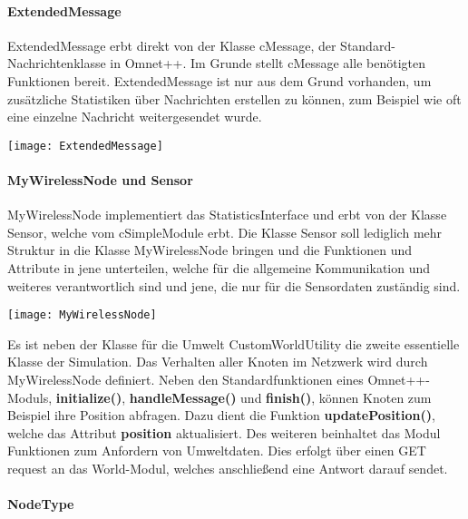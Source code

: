 \paragraph{ExtendedMessage}

ExtendedMessage erbt direkt von der Klasse cMessage, der Standard-Nachrichtenklasse in Omnet++. Im Grunde stellt cMessage alle benötigten Funktionen bereit. ExtendedMessage ist nur aus dem Grund vorhanden, um zusätzliche Statistiken über Nachrichten erstellen zu können, zum Beispiel wie oft eine einzelne Nachricht weitergesendet wurde.

\begin{center}
\texttt{[image: ExtendedMessage]}
\end{center}

\paragraph{MyWirelessNode und Sensor}

MyWirelessNode implementiert das StatisticsInterface und erbt von der Klasse Sensor, welche vom cSimpleModule erbt. Die Klasse Sensor soll lediglich mehr Struktur in die Klasse MyWirelessNode bringen und die Funktionen und Attribute in jene unterteilen, welche für die allgemeine Kommunikation und weiteres verantwortlich sind und jene, die nur für die Sensordaten zuständig sind. \newline

\begin{center}
\texttt{[image: MyWirelessNode]}
\end{center}

Es ist neben der Klasse für die Umwelt CustomWorldUtility die zweite essentielle Klasse der Simulation. Das Verhalten aller Knoten im Netzwerk wird durch MyWirelessNode definiert. Neben den Standardfunktionen eines Omnet++-Moduls, \textbf{initialize()}, \textbf{handleMessage()} und \textbf{finish()}, können Knoten zum Beispiel ihre Position abfragen. \newline
Dazu dient die Funktion \textbf{updatePosition()}, welche das Attribut \textbf{position} aktualisiert. Des weiteren beinhaltet das Modul Funktionen zum Anfordern von Umweltdaten. Dies erfolgt über einen GET request an das World-Modul, welches anschließend eine Antwort darauf sendet.

\paragraph{NodeType}

